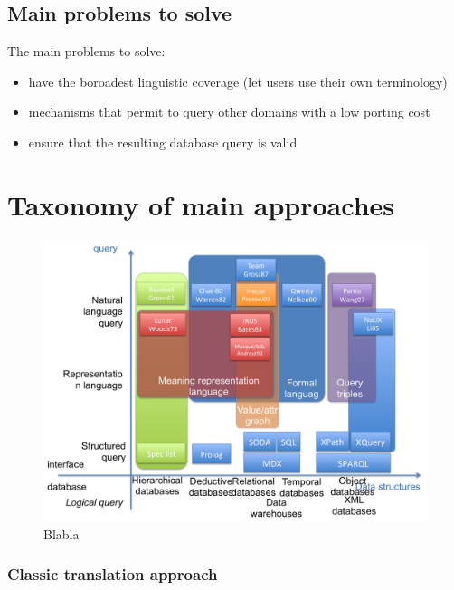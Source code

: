\documentclass[10pt,journal,letterpaper,compsoc]{IEEEtran}
\begin{document}
\subsection{Main problems to solve}
The main problems to solve:
\begin{itemize}
  \item have the boroadest linguistic coverage (let users use their own
  terminology)
  \item mechanisms that permit to query other domains with a low porting cost
  \item ensure that the resulting database query is valid
\end{itemize}









\section{Taxonomy of main approaches}
\label{sec:overview}


\begin{figure}
\centering
\includegraphics[width=12cm]{images/query-language}
\caption{Blabla}
\label{fig:query-languages}
\end{figure}


\subsubsection{Classic translation approach}
\end{document}
